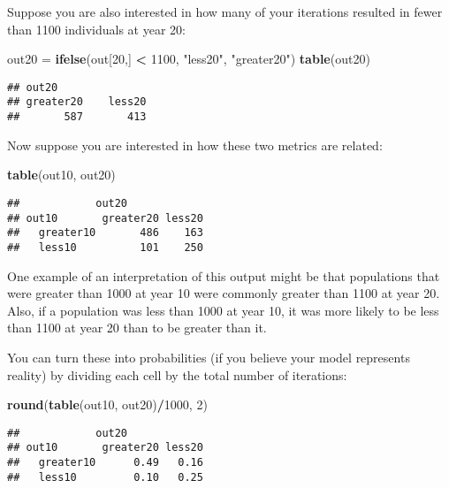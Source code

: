 \documentclass[]{book}
\newenvironment{Shaded}{\begin{snugshade}}{\end{snugshade}}
\newcommand{\DecValTok}[1]{\textcolor[rgb]{0.00,0.00,0.81}{#1}}
\newcommand{\KeywordTok}[1]{\textcolor[rgb]{0.13,0.29,0.53}{\textbf{#1}}}
\newcommand{\NormalTok}[1]{#1}
\newcommand{\OperatorTok}[1]{\textcolor[rgb]{0.81,0.36,0.00}{\textbf{#1}}}
\newcommand{\StringTok}[1]{\textcolor[rgb]{0.31,0.60,0.02}{#1}}
\begin{document}
Suppose you are also interested in how many of your iterations resulted in fewer than 1100 individuals at year 20:

\begin{Shaded}
\begin{Highlighting}[]
\NormalTok{out20 =}\StringTok{ }\KeywordTok{ifelse}\NormalTok{(out[}\DecValTok{20}\NormalTok{,] }\OperatorTok{<}\StringTok{ }\DecValTok{1100}\NormalTok{, }\StringTok{"less20"}\NormalTok{, }\StringTok{"greater20"}\NormalTok{)}
\KeywordTok{table}\NormalTok{(out20)}
\end{Highlighting}
\end{Shaded}

\begin{verbatim}
## out20
## greater20    less20 
##       587       413
\end{verbatim}

Now suppose you are interested in how these two metrics are related:

\begin{Shaded}
\begin{Highlighting}[]
\KeywordTok{table}\NormalTok{(out10, out20)}
\end{Highlighting}
\end{Shaded}

\begin{verbatim}
##            out20
## out10       greater20 less20
##   greater10       486    163
##   less10          101    250
\end{verbatim}

One example of an interpretation of this output might be that populations that were greater than 1000 at year 10 were commonly greater than 1100 at year 20. Also, if a population was less than 1000 at year 10, it was more likely to be less than 1100 at year 20 than to be greater than it.

You can turn these into probabilities (if you believe your model represents reality) by dividing each cell by the total number of iterations:

\begin{Shaded}
\begin{Highlighting}[]
\KeywordTok{round}\NormalTok{(}\KeywordTok{table}\NormalTok{(out10, out20)}\OperatorTok{/}\DecValTok{1000}\NormalTok{, }\DecValTok{2}\NormalTok{)}
\end{Highlighting}
\end{Shaded}

\begin{verbatim}
##            out20
## out10       greater20 less20
##   greater10      0.49   0.16
##   less10         0.10   0.25
\end{verbatim}
\end{document}
